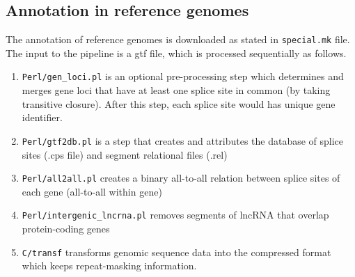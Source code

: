 \documentclass{article}
\begin{document}
\subsection{Annotation in reference genomes}
The annotation of reference genomes is downloaded as stated in {\tt special.mk} file. The input to the pipeline is a gtf 
file, which is processed sequentially as follows.
\begin{enumerate}
\item {\tt Perl/gen\_loci.pl} is an optional pre-processing step which determines and merges gene loci that have at least 
one splice site in common (by taking transitive closure). After this step, each splice site would has unique gene identifier.
\item {\tt Perl/gtf2db.pl} is a step that creates and attributes the database of splice sites (.cps file) and segment relational files (.rel)
\item {\tt Perl/all2all.pl} creates a binary all-to-all relation between splice sites of each gene (all-to-all within gene)
\item {\tt Perl/intergenic\_lncrna.pl} removes segments of lncRNA that overlap protein-coding genes
\item {\tt C/transf} transforms genomic sequence data into the compressed format which keeps repeat-masking information.
\end{enumerate}
\end{document}
